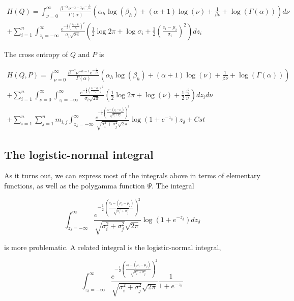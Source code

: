 \documentclass[12pt]{article}
\begin{document}
\begin{multline*}
    H(Q) = \int_{\nu=0}^{\infty} \frac{\beta^{-\alpha}\nu^{-\alpha-1}e^{-\frac{1}{\beta \nu}}}{\Gamma(\alpha) }
    \left(\alpha_h \log(\beta_h) + (\alpha+1)\log(\nu) + \frac{1}{\beta \nu} + \log(\Gamma(\alpha))\right)
    d\nu \\
    + \sum_{i=1}^n \int_{z_i=-\infty}^{\infty} \frac{e^{-\frac{1}{2}\left(\frac{z_i-\mu_i}{\sigma_i}\right)^2}}{\sigma_i \sqrt{2 \pi}}
    \left(\frac{1}{2} \log{2\pi} + \log{\sigma_i} + \frac{1}{2}\left(\frac{z_i-\mu_i}{\sigma_i}\right)^2\right) dz_i
\end{multline*}


The cross entropy of $Q$ and $P$ is

\begin{multline*}
    H(Q,P) = \int_{\nu=0}^{\infty} \frac{\beta^{-\alpha}\nu^{-\alpha-1}e^{-\frac{1}{\beta \nu}}}{\Gamma(\alpha)}
\left(\alpha_h \log(\beta_h) + (\alpha+1)\log(\nu) + \frac{1}{\beta \nu} + \log(\Gamma(\alpha))\right)
\\
+ \sum_{i=1}^n \int_{\nu=0}^{\infty} \int_{z_i=-\infty}^{\infty} \frac{e^{-\frac{1}{2}\left(\frac{z_i-\mu_i}{\sigma_i}\right)^2}}{\sigma_i \sqrt{2 \pi}} \left(
\frac{1}{2} \log{2\pi} + \log(\nu) + \frac{1}{2}\frac{z_i^2}{\nu}
\right)dz_i d\nu\\
+ \sum_{i=1}^n\sum_{j=1}^n m_{i,j} \int_{z_\delta=-\infty}^{\infty}
\frac{e^{-\frac{1}{2}\left(\frac{z_\delta - (\mu_i - \mu_j)}{\sqrt{\sigma_i^2 + \sigma_j^2}}\right)^2}}{\sqrt{\sigma_i^2 + \sigma_j^2} \sqrt{2 \pi}} \log\left(1 + e^{-z_\delta}\right) z_\delta +
Cst
\end{multline*}


\subsection{The logistic-normal integral}

As it turns out, we can express most of the integrals above in terms of elementary functions, as well as the polygamma function $\Psi$.
The integral

$$\int_{z_\delta=-\infty}^{\infty}
\frac{e^{-\frac{1}{2}\left(\frac{z_\delta - (\mu_i - \mu_j)}{\sqrt{\sigma_i^2 + \sigma_j^2}}\right)^2}}{\sqrt{\sigma_i^2 + \sigma_j^2} \sqrt{2 \pi}} \log\left(1 + e^{-z_\delta}\right) dz_\delta$$

is more problematic. A related integral is the logistic-normal integral,

$$\int_{z_\delta=-\infty}^{\infty}
\frac{e^{-\frac{1}{2}\left(\frac{z_\delta - (\mu_i - \mu_j)}{\sqrt{\sigma_i^2 + \sigma_j^2}}\right)^2}}{\sqrt{\sigma_i^2 + \sigma_j^2} \sqrt{2 \pi}} \frac{1}{1 + e^{-z_\delta}}$$
\end{document}
